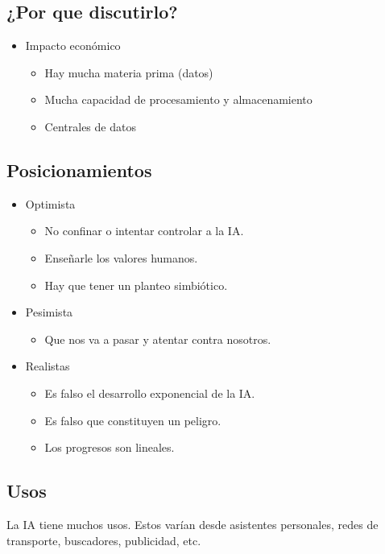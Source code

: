 \documentclass[titlepage,a4paper]{article}
\begin{document}
\subsection{¿Por que discutirlo?}
\begin{itemize}
    \item Impacto económico
    \begin{itemize}
        \item Hay mucha materia prima (datos)
        \item Mucha capacidad de procesamiento y almacenamiento
        \item Centrales de datos
    \end{itemize}
\end{itemize}

\subsection{Posicionamientos}
\begin{itemize}
    \item Optimista
    \begin{itemize}
        \item No confinar o intentar controlar a la IA.
        \item Enseñarle los valores humanos.
        \item Hay que tener un planteo simbiótico.
    \end{itemize}
    \item Pesimista
        \begin{itemize}
        \item Que nos va a pasar y atentar contra nosotros.
    \end{itemize}
    \item Realistas
        \begin{itemize}
        \item Es falso el desarrollo exponencial de la IA.
        \item Es falso que constituyen un peligro.
        \item Los progresos son lineales.
    \end{itemize}
\end{itemize}

\subsection{Usos}
La IA tiene muchos usos. Estos varían desde asistentes personales, redes de transporte, buscadores, publicidad, etc. 
\end{document}

